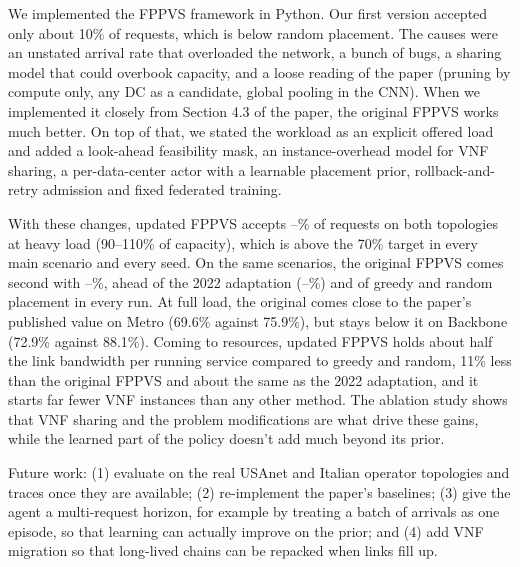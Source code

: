 We implemented the FPPVS framework in Python. Our first version accepted only
about 10\% of requests, which is below random placement. The causes were an
unstated arrival rate that overloaded the network, a bunch of bugs, a sharing
model that could overbook capacity, and a loose reading of the paper (pruning by
compute only, any DC as a candidate, global pooling in the CNN). When we
implemented it closely from Section 4.3 of the paper, the original FPPVS works
much better. On top of that, we stated the workload as an explicit offered load
and added a look-ahead feasibility mask, an instance-overhead model for VNF
sharing, a per-data-center actor with a learnable placement prior,
rollback-and-retry admission and fixed federated training.

With these changes, updated FPPVS accepts \fppvsMinAcc--\fppvsMaxAcc\% of
requests on both topologies at heavy load (90--110\% of capacity), which is
above the 70\% target in every main scenario and every seed. On the same
scenarios, the original FPPVS comes second with \origMinAcc--\origMaxAcc\%,
ahead of the 2022 adaptation (\zhangMinAcc--\zhangMaxAcc\%) and of greedy and
random placement in every run. At full load, the original comes close to the
paper's published value on Metro (69.6\% against 75.9\%), but stays below it on
Backbone (72.9\% against 88.1\%). Coming to resources, updated FPPVS holds about
half the link bandwidth per running service compared to greedy and random, 11\%
less than the original FPPVS and about the same as the 2022 adaptation, and it
starts far fewer VNF instances than any other method. The ablation study shows
that VNF sharing and the problem modifications are what drive these gains, while
the learned part of the policy doesn't add much beyond its prior.

Future work: (1) evaluate on the real USAnet and Italian operator topologies and
traces once they are available; (2) re-implement the paper's baselines; (3) give
the agent a multi-request horizon, for example by treating a batch of arrivals
as one episode, so that learning can actually improve on the prior; and (4) add
VNF migration so that long-lived chains can be repacked when links fill up.
